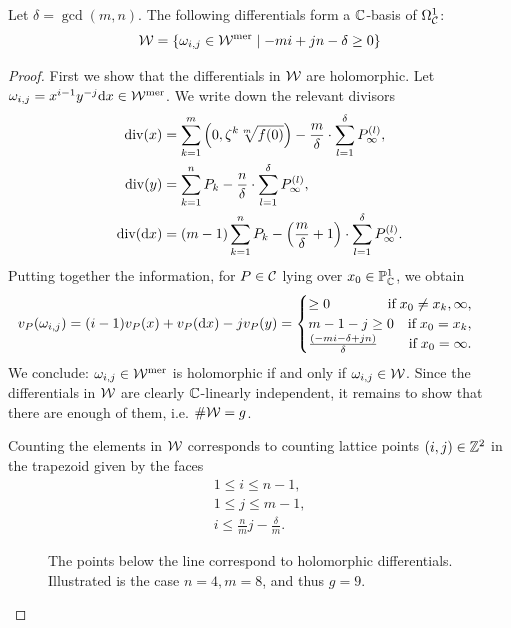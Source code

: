 \documentclass[main.tex]{subfiles}
\begin{document}
     \begin{prop}\label{prop:holom_diff}
 Let $\delta = \gcd(m,n)$. The following differentials form  a $\mathbb{C}$-basis of $\Omega^1_{\mathcal{C}}$:
 \begin{equation*}\label{eq:holm_diff}
   \mathcal{W} =  \left\{  \omega_{i,j} \in \mathcal{W}^{\text{mer}}  \mid  -mi + jn - \delta \ge 0  \right\}
 \end{equation*}
     \end{prop}
     \begin{proof}
      First we show that the differentials in $\mathcal{W}$ are holomorphic.
      Let $\omega_{i,j} = x^{i-1}y^{-j} \mathrm d x \in \mathcal{W}^{\text{mer}}$. We write down the relevant divisors
      \begin{align*}
       \operatorname{div}(x) & = \sum_{k=1}^m \left(0,\zeta^k\sqrt[m]{f(0)}\right) - \frac{m}{\delta} \cdot \sum_{l = 1}^{\delta} P_{\infty}^{(l)}, \\
       \operatorname{div}(y) & = \sum_{k = 1}^n P_k - \frac{n}{\delta} \cdot \sum_{l = 1}^{\delta}  P_{\infty}^{(l)}, \\
       \operatorname{div}(\mathrm d x) & = (m-1)\sum_{k = 1}^n P_k - \left(\frac{m}{\delta} + 1\right)\cdot \sum_{l = 1}^{\delta}  P_{\infty}^{(l)}.
      \end{align*}
     Putting together the information, for $P \in \mathcal{C}$ lying over $x_0 \in \mathbb{P}^1_{\mathbb{C}}$, we obtain
     \begin{align}\label{eq:diff_cases}
      v_P(\omega_{i,j}) & = (i-1) v_P(x) + v_P(\dx)  - j v_P(y) = 
 \begin{cases}
  \ge 0 \hfill \text{if} \; x_0 \ne x_k,\infty, \\
  m-1-j \ge 0 \quad \text{if} \; x_0 = x_k, \\
  \frac{(-mi-\delta+jn)}{\delta} \hfill \text{if}\;  x_0 = \infty.
 \end{cases}
     \end{align}
     We conclude: $\omega_{i,j} \in \mathcal{W}^{\text{mer}}$ is holomorphic if and only if $\omega_{i,j} \in \mathcal{W}$. \abstand
     Since the differentials in $\mathcal{W}$ are clearly $\mathbb{C}$-linearly independent, it remains to show that
     there are enough of them, i.e. $\#\mathcal{W} = g$.
     \medskip

     Counting the elements in $\mathcal{W}$ corresponds to counting lattice points
     $(i,j) \in \mathbb{Z}^2$ in the trapezoid given by the faces
     \begin{align*}
 1 \le i \le n-1,\\
 1 \le j \le m-1, \\
 i \le \frac{n}{m}j - \frac{\delta}{m}.
     \end{align*}
      \begin{figure}[H]
      \begin{center}
   
      \end{center}
    \caption{The points below the line correspond to holomorphic differentials.
    Illustrated is the case $n=4,m=8$, and thus $g = 9$.}
    \label{fig:holom_diff}
\end{figure}


\end{proof}
\end{document}
